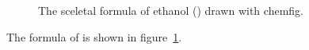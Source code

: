 \documentclass{article}
\newcommand*\pkg[1]{\textsf{#1}}
\begin{document}
\begin{figure}
  \centering
  \caption{The sceletal formula of ethanol () drawn with
    \pkg{chemfig}.}
  \label{fig:ethanol}
\end{figure}

The formula of  is shown in figure~\ref{fig:ethanol}.
\end{document}
